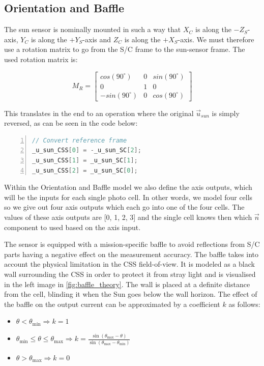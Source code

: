 \subsection{Orientation and Baffle}
The sun sensor is nominally mounted in such a way that $X_C$ is along the $-Z_S$-axis, $Y_C$ is along the $+Y_S$-axis and $Z_C$ is along the $+X_S$-axis. 
We must therefore use a rotation matrix to go from the S/C frame to the sun-sensor frame.
The used rotation matrix is:

\begin{equation}
M_R = 
\begin{bmatrix}
    cos(90^\circ) & 0 & sin(90^\circ)\\
    0 & 1 & 0 \\
    -sin(90^\circ) & 0 & cos(90^\circ)
\end{bmatrix}	
\end{equation}

This translates in the end to an operation where the original $\Vec{u}_{sun}$ is simply reversed, as can be seen in the code below:
\begin{lstlisting}[frame=single, numbers=left, basicstyle=\tiny, language=c++]
// Convert reference frame
_u_sun_CSS[0] = -_u_sun_SC[2];
_u_sun_CSS[1] = _u_sun_SC[1];
_u_sun_CSS[2] = _u_sun_SC[0];
\end{lstlisting}

\vspace{0.5cm}

Within the Orientation and Baffle model we also define the axis outputs, which will be the inputs for each single photo cell. In other words, we model four cells so we give out four axis outputs which each go into one of the four cells. The values of these axis outputs are [0, 1, 2, 3] and the single cell knows then which $\Vec{n}$ component to used based on the axis input.


The sensor is equipped with a mission-specific baffle to avoid reflections from S/C parts having a negative effect on the measurement accuracy. 
The baffle takes into account the physical limitation in the CSS field-of-view. 
It is modeled as a black wall surrounding the CSS in order to protect it from stray light and is visualised in the left image in \autoref{fig:baffle_theory}.
The wall is placed at a definite distance from the cell, blinding it when the Sun goes below the wall horizon. The effect of the baffle on the output current can be approximated by a coefficient $k$ as follows:
\begin{itemize}
    \item $\theta < \theta_{\min} \Rightarrow k = 1$
    \item $\theta_{\min} \leq \theta \leq \theta_{\max} \Rightarrow k = \frac{\sin(\theta_{\max} - \theta)}{\sin(\theta_{\max} - \theta_{\min})}$
    \item $\theta > \theta_{\max} \Rightarrow k = 0$
\end{itemize}

